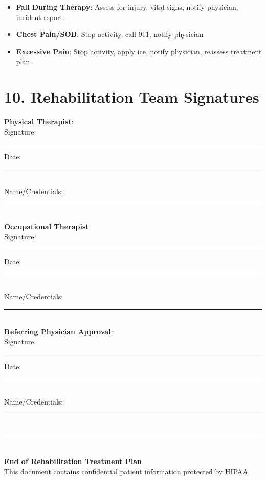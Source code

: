 \documentclass[11pt,letterpaper]{article}
\begin{document}
\begin{itemize}[leftmargin=*]
    \item \textbf{Fall During Therapy}: Assess for injury, vital signs, notify physician, incident report
    \item \textbf{Chest Pain/SOB}: Stop activity, call 911, notify physician
    \item \textbf{Excessive Pain}: Stop activity, apply ice, notify physician, reassess treatment plan
\end{itemize}

\vspace{2em}

\section*{10. Rehabilitation Team Signatures}

\textbf{Physical Therapist}:\\[0.5em]
Signature: \rule{6cm}{0.5pt} \quad Date: \rule{3cm}{0.5pt}\\
Name/Credentials: \rule{6cm}{0.5pt}\\[1em]

\textbf{Occupational Therapist}:\\[0.5em]
Signature: \rule{6cm}{0.5pt} \quad Date: \rule{3cm}{0.5pt}\\
Name/Credentials: \rule{6cm}{0.5pt}\\[1em]

\textbf{Referring Physician Approval}:\\[0.5em]
Signature: \rule{6cm}{0.5pt} \quad Date: \rule{3cm}{0.5pt}\\
Name/Credentials: \rule{6cm}{0.5pt}\\

\vspace{2em}
\begin{center}
\rule{\textwidth}{1pt}\\
\textbf{End of Rehabilitation Treatment Plan}\\
This document contains confidential patient information protected by HIPAA.
\end{center}
\end{document}

